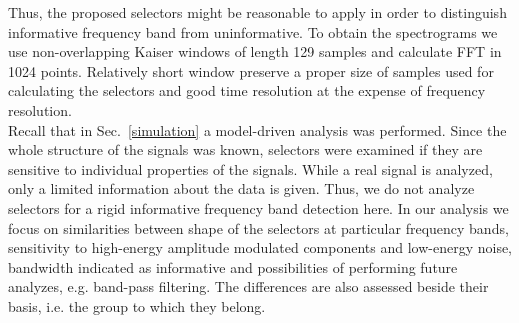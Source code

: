 \documentclass[3p,times]{elsarticle}
\begin{document}
Thus, the proposed selectors might be reasonable to apply in order to distinguish informative frequency band from uninformative. To obtain the spectrograms we use non-overlapping Kaiser windows of length 129 samples and calculate FFT in 1024 points. Relatively short window preserve a proper size of samples used for calculating the selectors and good time resolution at the expense of frequency resolution.\\
Recall that in Sec.~\ref{simulation} a model-driven analysis was performed. Since the whole structure of the signals was known, selectors were examined if they are sensitive to individual properties of the signals. While a real signal is analyzed, only a limited information about the data is given. Thus, we do not analyze selectors for a rigid informative frequency band detection here. In our analysis we focus on similarities between shape of the selectors at particular frequency bands, sensitivity to high-energy amplitude modulated components and low-energy noise, bandwidth indicated as informative and possibilities of performing future analyzes, e.g. band-pass filtering. The differences are also assessed beside their basis, i.e. the group to which they belong.\\
\end{document}
